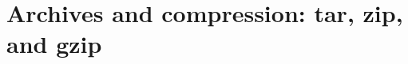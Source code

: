 \chapter{Archives and compression: tar, zip, and gzip}
\label{ch:archives-and-compression-tar-zip-and}

